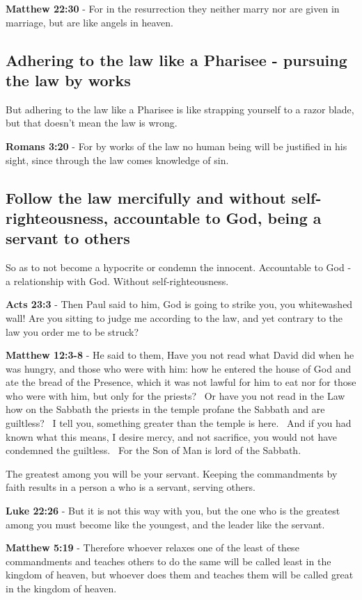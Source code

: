 \documentclass[11pt]{article}
\begin{document}
\textbf{Matthew 22:30} - For in the resurrection they neither marry nor are given in marriage, but are like angels in heaven.

\subsection{Adhering to the law like a Pharisee - pursuing the law by works}
\label{sec:orgd660816}
But adhering to the law like a Pharisee is like strapping yourself to a razor blade, but that doesn't mean the law is wrong.

\textbf{Romans 3:20} - For by works of the law no human being will be justified in his sight, since through the law comes knowledge of sin.

\subsection{Follow the law mercifully and without self-righteousness, accountable to God, being a servant to others}
\label{sec:orgdf2ded0}
So as to not become a hypocrite or condemn the innocent.
Accountable to God - a relationship with God.
Without self-righteousness.

\textbf{Acts 23:3} - Then Paul said to him, God is going to strike you, you whitewashed wall! Are you sitting to judge me according to the law, and yet contrary to the law you order me to be struck?

\textbf{Matthew 12:3-8} - He said to them, Have you not read what David did when he was hungry, and those who were with him: how he entered the house of God and ate the bread of the Presence, which it was not lawful for him to eat nor for those who were with him, but only for the priests?  Or have you not read in the Law how on the Sabbath the priests in the temple profane the Sabbath and are guiltless?  I tell you, something greater than the temple is here.  And if you had known what this means, I desire mercy, and not sacrifice, you would not have condemned the guiltless.  For the Son of Man is lord of the Sabbath.

The greatest among you will be your servant.
Keeping the commandments by faith results in a person a who is a servant, serving others.

\textbf{Luke 22:26} - But it is not this way with you, but the one who is the greatest among you must become like the youngest, and the leader like the servant.

\textbf{Matthew 5:19} - Therefore whoever relaxes one of the least of these commandments and teaches others to do the same will be called least in the kingdom of heaven, but whoever does them and teaches them will be called great in the kingdom of heaven.
\end{document}
